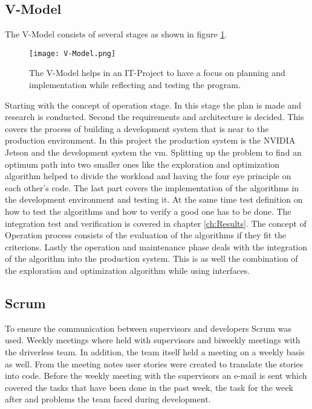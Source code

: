 \subsection{V-Model} \label{sec:Planning Method: V-Model}
The V-Model consists of several stages as shown in figure \ref{fig:V-Model}. 
\begin{figure}[H]
    \centering
    \texttt{[image: V-Model.png]}
    \caption{The V-Model helps in an IT-Project to have a focus on planning and implementation while reflecting and testing the program.}
    \label{fig:V-Model}
\end{figure}

Starting with the concept of operation stage. In this stage the plan is made and research is conducted. Second the requirements and architecture is decided. This covers the process of building a development system that is near to the production environment. In this project the production system is the NVIDIA Jetson and the development system the \acrlong{vm}. Splitting up the problem to find an optimum path into two smaller ones like the exploration and optimization algorithm helped to divide the workload and having the four eye principle on each other's code. The last part covers the implementation of the algorithms in the development environment and testing it. At the same time test definition on how to test the algorithms and how to verify a good one has to be done. The integration test and verification is covered in chapter \ref{ch:Results}. The concept of Operation process consists of the evaluation of the algorithms if they fit the criterions. Lastly the operation and maintenance phase deals with the integration of the algorithm into the production system. This is as well the combination of the exploration and optimization algorithm while using interfaces.

\subsection{Scrum} \label{sec:Planning Method: Scrum}
To ensure the communication between supervisors and developers Scrum was used. Weekly meetings where held with supervisors and biweekly meetings with the driverless team. In addition, the team itself held a meeting on a weekly basis as well. From the meeting notes user stories were created to translate the stories into code. Before the weekly meeting with the supervisors an e-mail is sent which covered the tasks that have been done in the past week, the task for the week after and problems the team faced during development.

